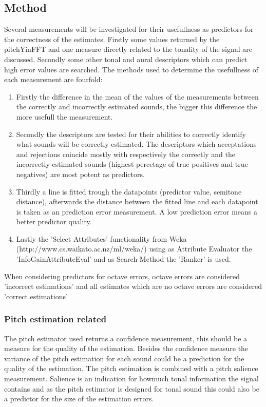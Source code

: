 \documentclass{article}
\begin{document}
\subsection{Method}
Several measurements will be investigated for their usefullness as predictors for the correctness of the estimates. Firstly some values returned by the pitchYinFFT and one measure directly related to the tonality of the signal are discussed. Secondly some other tonal and aural descriptors which can predict high error values are searched. The methods used to determine the usefullness of each measurement are fourfold:
\begin{enumerate}
    \item Firstly the difference in the mean of the values of the measurements between the correctly and incorrectly estimated sounds, the bigger this difference the more usefull the measurement. 
    \item Secondly the descriptors are tested for their abilities to correctly identify what sounds will be correctly estimated. The descriptors which acceptations and rejections coincide mostly with respectively the correctly and the incorrectly estimated sounds (highest percetage of true positives and true negatives) are most potent as predictors. 
    \item Thirdly a line is fitted trough the datapoints (predictor value, semitone distance), afterwards the distance between the fitted line and each datapoint is taken as an prediction error measurement. A low prediction error means a better predictor quality.
    \item Lastly the 'Select Attributes' functionality from Weka (http://www.cs.waikato.ac.nz/ml/weka/) using as Attribute Evaluator the 'InfoGainAttributeEval' and as Search Method the 'Ranker' is used.
\end{enumerate}
When considering predictors for octave errors, octave errors are considered 'incorrect estimations' and all estimates which are no octave errors are considered 'correct estimations'

\subsubsection{Pitch estimation related}
The pitch estimator used returns a confidence measurement, this should be a measure for the quality of the estimation. Besides the confidence measure the variance of the pitch estimation for each sound could be a prediction for the quality of the estimation. The pitch estimation is combined with a pitch salience measurement. Salience is an indication for howmuch tonal information the signal contains and as the pitch estimator is designed for tonal sound this could also be a predictor for the size of the estimation errors.
\end{document}
